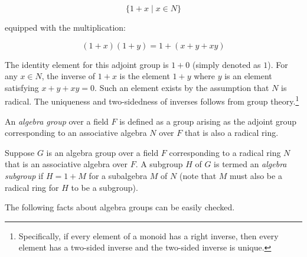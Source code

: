 \documentclass{ucetd}
\begin{document}
$$\{ 1 + x \mid x \in N \}$$

equipped with the multiplication:

$$(1 + x)(1 + y) = 1 + (x + y + xy)$$

The identity element for this adjoint group is $1 + 0$ (simply denoted
as $1$). For any $x \in N$, the inverse of $1 + x$ is the element $1 +
y$ where $y$ is an element satisfying $x + y + xy = 0$. Such an
element exists by the assumption that $N$ is radical. The uniqueness
and two-sidedness of inverses follows from group
theory.\footnote{Specifically, if every element of a monoid has a
  right inverse, then every element has a two-sided inverse and the
  two-sided inverse is unique.}

An {\em algebra group} over a field $F$ is defined as a group arising
as the adjoint group corresponding to an associative algebra $N$ over
$F$ that is also a radical ring.

Suppose $G$ is an algebra group over a field $F$ corresponding to a
radical ring $N$ that is an associative algebra over $F$. A subgroup
$H$ of $G$ is termed an {\em algebra subgroup} if $H = 1 + M$ for a
subalgebra $M$ of $N$ (note that $M$ must also be a radical ring for
$H$ to be a subgroup).

The following facts about algebra groups can be easily checked.
\end{document}
